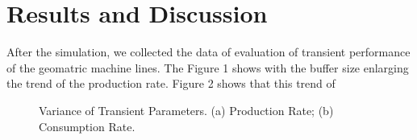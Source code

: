 \section{Results and Discussion}
\noindent After the simulation, we collected the data of evaluation of transient performance of the geomatric machine lines. The Figure 1 shows with the buffer size enlarging the trend of the production rate. Figure 2 shows that this trend of 

\begin{figure*}[!h]
    \centering
    \caption{Variance of Transient Parameters. (a) Production Rate; (b) Consumption Rate.}
    \label{p c rate N buffer}
\end{figure*}